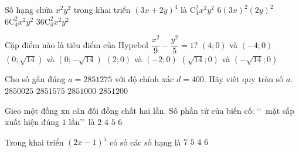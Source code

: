 \begin{ex}%
	Số hạng chứa $x^2y^2$ trong khai triển $(3x+2y)^4$ là
	\choice
	{$\mathrm{C}_4^2x^2y^2$}
	{\True $6(3x)^2(2y)^2$}
	{$6\mathrm{C}_4^2x^2y^2$}
	{$36\mathrm{C}_4^2x^2y^2$}
\end{ex}
\begin{ex}%
	Cặp điểm nào là tiêu điểm của Hypebol $\dfrac{x^2}{9}-\dfrac{y^2}{5}=1$?
	\choice
	{$(4;0)$ và $(-4;0)$}
	{$(0;\sqrt{14})$ và $(0;-\sqrt{14})$}
	{$(2;0)$ và $(-2;0)$}
	{\True $(\sqrt{14};0)$ và $(-\sqrt{14};0)$}
\end{ex}
\begin{ex}%
	Cho số gần đúng $a = 2851275$ với độ chính xác $d = 400$. Hãy viết quy tròn số $a$.
	\choice
	{$2850025$}
	{$2851575$}
	{\True $2851000$}
	{$2851200$}
\end{ex}
\begin{ex}%
	Gieo một đồng xu cân đối đồng chất hai lần. Số phần tử của biến cố: \lq\lq~mặt sấp xuất hiện đúng $1$ lần\rq\rq~là
	\choice
	{\True $2$}
	{$4$}
	{$5$}
	{$6$}
\end{ex}
\begin{ex}%
	Trong khai triển $(2x-1)^5$ có số các số hạng là
	\choice
	{$7$}
	{$5$}
	{$4$}
	{\True $6$}
\end{ex}
